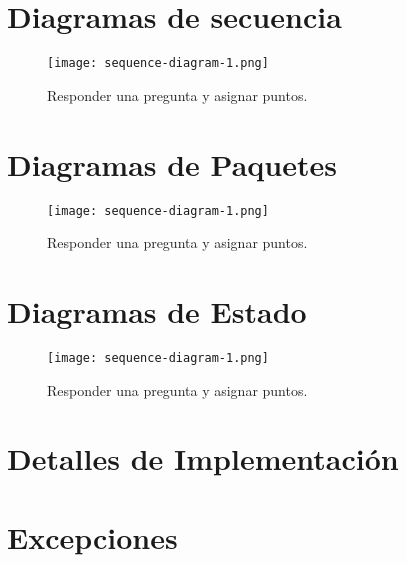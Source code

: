 \documentclass[titlepage,a4paper]{article}
\begin{document}
\section{Diagramas de secuencia}\label{sec:diagramasdesecuencia}

\begin{figure}[H]
\centering
\texttt{[image: sequence-diagram-1.png]}
\caption{\label{fig:seq01}Responder una pregunta y asignar puntos.}
\end{figure}


\section{Diagramas de Paquetes}\label{sec:diagramasdepaquetes}

\begin{figure}[H]
\centering
\texttt{[image: sequence-diagram-1.png]}
\caption{\label{fig:seq01}Responder una pregunta y asignar puntos.}
\end{figure}


\section{Diagramas de Estado}\label{sec:diagramasdeestado}

\begin{figure}[H]
\centering
\texttt{[image: sequence-diagram-1.png]}
\caption{\label{fig:seq01}Responder una pregunta y asignar puntos.}
\end{figure}


\section{Detalles de Implementación}\label{sec:detallesdeimplementacion}

\subsection{}


\section{Excepciones}\label{sec:excepciones}

\begin{description}
\item[]

\end{description}
\end{document}
